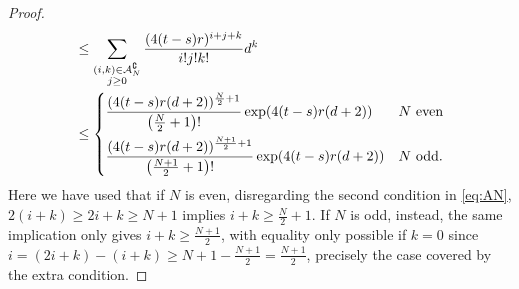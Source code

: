\documentclass{article}
\numberwithin{equation}{section}
\theoremstyle{definition}
\theoremstyle{remark}
\begin{document}
\begin{proof}
\begin{align*}
	&\leq  \sum_{\substack{(i,k) \in \mathcal A_N^\complement \\ j \geq 0}} \frac{(4(t-s)r)^{i+j+k}}{i!j!k!} d^k \\
	&\leq \begin{dcases}
		\frac{(4(t-s)r(d+2))^{\frac N2+1}}{\big(\frac N2+1\big)!}\exp(4(t-s)r(d+2)) &N \text{ even} \\
		\frac{(4(t-s)r(d+2))^{\frac{N+1}2+1}}{\big(\frac{N+1}2+1\big)!}\exp(4(t-s)r(d+2)) &N \text{ odd.}
	\end{dcases}
\end{align*}
Here we have used that if $N$ is even, disregarding the second condition in \eqref{eq:AN}, $2(i+k) \geq 2i + k \geq N+1$ implies $i+k \geq \frac N2 + 1$. If $N$ is odd, instead, the same implication only gives $i + k \geq \frac{N+1}2$, with equality only possible if $k = 0$ since $i = (2i+k) - (i+k) \geq N+1 - \frac{N+1}{2} = \frac{N+1}{2}$, precisely the case covered by the extra condition.


\end{proof}
\end{document}
